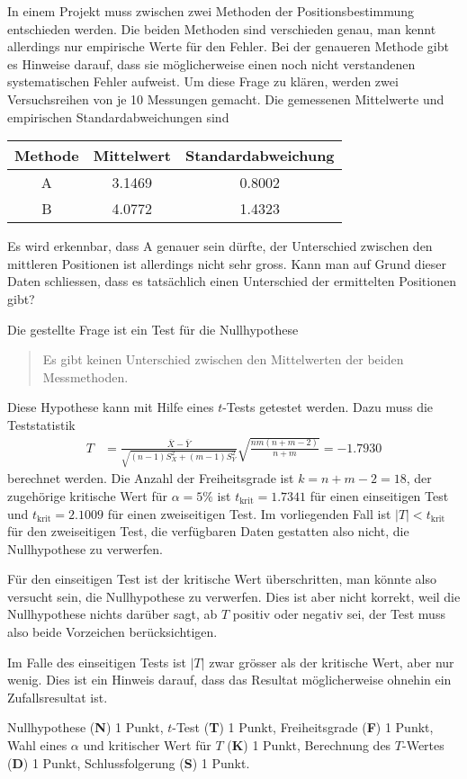 In einem Projekt muss zwischen zwei Methoden der Positionsbestimmung
entschieden werden.
Die beiden Methoden sind verschieden genau, man kennt allerdings nur
empirische Werte für den Fehler.
Bei der genaueren Methode gibt es Hinweise darauf, dass sie möglicherweise einen
noch nicht verstandenen systematischen Fehler aufweist.
Um diese Frage zu klären, werden zwei Versuchsreihen von je 10 Messungen
gemacht.
Die gemessenen Mittelwerte und empirischen Standardabweichungen sind
\begin{center}
\begin{tabular}{|c|cc|}
\hline
Methode&Mittelwert&Standardabweichung\\
\hline
A      & 3.1469   &   0.8002         \\
B      & 4.0772   &   1.4323         \\
\hline
\end{tabular}
\end{center}
Es wird erkennbar, dass A genauer sein dürfte, der Unterschied zwischen
den mittleren Positionen ist allerdings nicht sehr gross.
Kann man auf Grund dieser Daten schliessen, dass es tatsächlich einen
Unterschied der ermittelten Positionen gibt?



\begin{loesung}
Die gestellte Frage ist ein Test für die Nullhypothese 
\begin{quote}
Es gibt keinen Unterschied zwischen den Mittelwerten der
beiden Messmethoden.
\end{quote}
Diese Hypothese kann mit Hilfe eines $t$-Tests getestet werden.
Dazu muss die Teststatistik
\begin{align*}
T
&=
\frac{\bar{X}-\bar{Y}}{\sqrt{(n-1)S_X^2 + (m-1)S_Y^2}}
\sqrt{\frac{nm(n+m-2)}{n+m}}
=-1.7930
\end{align*}
berechnet werden.
Die Anzahl der Freiheitsgrade ist $k=n+m-2 = 18$, der zugehörige kritische
Wert für $\alpha=5\%$ ist $t_{\text{krit}}=1.7341$ für einen
einseitigen Test und $t_{\text{krit}}=2.1009$ für einen zweiseitigen Test.
Im vorliegenden Fall ist $|T|<t_{\text{krit}}$ für den zweiseitigen Test,
die verfügbaren Daten gestatten also nicht, die Nullhypothese zu verwerfen.

Für den einseitigen Test ist der kritische Wert überschritten, man könnte
also versucht sein, die Nullhypothese zu verwerfen.
Dies ist aber nicht korrekt, weil die Nullhypothese nichts darüber
sagt, ab $T$ positiv oder negativ sei, der Test muss also beide
Vorzeichen berücksichtigen.

Im Falle des einseitigen Tests ist $|T|$ zwar grösser als der kritische
Wert, aber nur wenig.
Dies ist ein Hinweis darauf, dass das Resultat möglicherweise ohnehin
ein Zufallsresultat ist.
\end{loesung}

\begin{bewertung}
Nullhypothese ({\bf N}) 1 Punkt,
$t$-Test ({\bf T}) 1 Punkt,
Freiheitsgrade ({\bf F}) 1 Punkt,
Wahl eines $\alpha$ und kritischer Wert für $T$ ({\bf K}) 1 Punkt,
Berechnung des $T$-Wertes ({\bf D}) 1 Punkt,
Schlussfolgerung ({\bf S}) 1 Punkt.
\end{bewertung}


